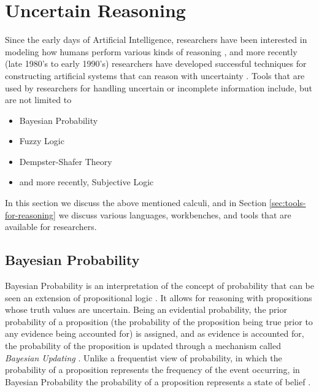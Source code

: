\documentclass[thesis.tex]{subfiles}
\begin{document}
\section{Uncertain Reasoning}
\label{sec:uncertain-reasoning}


Since the early days of Artificial Intelligence, researchers have been interested in modeling
how humans perform various kinds of reasoning \cite{russell2003}, and more recently (late 1980's to early 1990's)
researchers have developed successful techniques for constructing artificial systems that can reason with
uncertainty \cite{russell2003}. Tools that are used by researchers for handling uncertain or incomplete
information include, but are not limited to

\begin{itemize}
  \item Bayesian Probability
  \item Fuzzy Logic
  \item Dempster-Shafer Theory
  \item and more recently, Subjective Logic
\end{itemize}

In this section we discuss the above mentioned calculi, and in Section \ref{sec:tools-for-reasoning} we discuss
various languages, workbenches, and tools that are available for researchers.


%
%



\subsection{Bayesian Probability}

Bayesian Probability is an interpretation of the concept of probability that
can be seen an extension of propositional logic \cite{carnap1962logical}. It allows for reasoning with
propositions whose truth values are uncertain. Being an evidential probability,
the prior probability of a proposition (the probability of the proposition being
true prior to any evidence being accounted for) is assigned, and as evidence is
accounted for, the probability of the proposition is updated through a mechanism
called \emph{Bayesian Updating} \cite{paulos2011mathematics}. Unlike a frequentist
view of probability, in which the probability of a proposition represents the frequency
of the event occurring, in Bayesian Probability the probability of a proposition
represents a state of belief \cite{de1977theory}.
\end{document}

